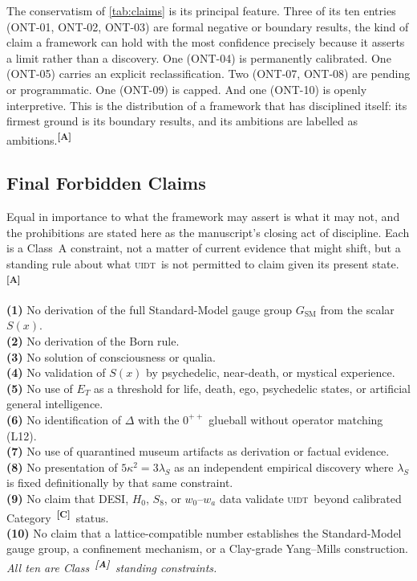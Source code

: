 \documentclass[12pt,a4paper,twoside]{article}
\theoremstyle{plain}
\theoremstyle{definition}
\theoremstyle{remark}
\newcommand{\UIDT}{\textsc{uidt}}
\newcommand{\catmark}[1]{\textsuperscript{\textsf{\textbf{[#1]}}}}
\begin{document}
\noindent The conservatism of \cref{tab:claims} is its principal feature. Three of its ten entries (ONT-01, ONT-02, ONT-03) are formal negative or boundary results, the kind of claim a framework can hold with the most confidence precisely because it asserts a limit rather than a discovery. One (ONT-04) is permanently calibrated. One (ONT-05) carries an explicit reclassification. Two (ONT-07, ONT-08) are pending or programmatic. One (ONT-09) is capped. And one (ONT-10) is openly interpretive. This is the distribution of a framework that has disciplined itself: its firmest ground is its boundary results, and its ambitions are labelled as ambitions.\catmark{A}

\subsection{Final Forbidden Claims}
\label{subsec:forbidden-claims}

Equal in importance to what the framework may assert is what it may not, and the prohibitions are stated here as the manuscript's closing act of discipline. Each is a Class~A constraint, not a matter of current evidence that might shift, but a standing rule about what \UIDT\ is not permitted to claim given its present state.\catmark{A}

\begin{governancebox}
\textbf{(1)} No derivation of the full Standard-Model gauge group
$G_{\mathrm{SM}}$ from the scalar $S(x)$.\\[0.3em]
\textbf{(2)} No derivation of the Born rule.\\[0.3em]
\textbf{(3)} No solution of consciousness or qualia.\\[0.3em]
\textbf{(4)} No validation of $S(x)$ by psychedelic, near-death, or mystical
experience.\\[0.3em]
\textbf{(5)} No use of $E_T$ as a threshold for life, death, ego, psychedelic
states, or artificial general intelligence.\\[0.3em]
\textbf{(6)} No identification of $\Delta$ with the $0^{++}$ glueball without
operator matching (L12).\\[0.3em]
\textbf{(7)} No use of quarantined museum artifacts as derivation or factual
evidence.\\[0.3em]
\textbf{(8)} No presentation of $5\kappa^2 = 3\lambda_S$ as an independent
empirical discovery where $\lambda_S$ is fixed definitionally by that same
constraint.\\[0.3em]
\textbf{(9)} No claim that DESI, $H_0$, $S_8$, or $w_0$--$w_a$ data validate
\UIDT\ beyond calibrated Category~\catmark{C}\ status.\\[0.3em]
\textbf{(10)} No claim that a lattice-compatible number establishes the
Standard-Model gauge group, a confinement mechanism, or a Clay-grade
Yang--Mills construction.\\[0.3em]
\emph{All ten are Class~\catmark{A}\ standing constraints.}
\end{governancebox}
\end{document}
